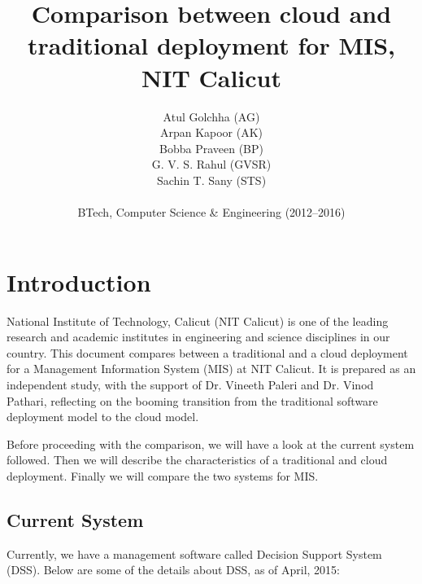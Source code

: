 \documentclass[12pt,a4paper,oneside]{article}
\begin{document}
\title{Comparison between cloud and traditional deployment for MIS, NIT Calicut}
\author{Atul Golchha (AG)
	\\
	Arpan Kapoor (AK)
	\\
	Bobba Praveen (BP)
	\\
	G. V. S. Rahul (GVSR)
	\\
	Sachin T. Sany (STS)
	\\ \\
	BTech, Computer Science \& Engineering (2012--2016)}


\maketitle

\renewcommand \vhAuthorColWidth{.8\hsize}
\renewcommand \vhChangeColWidth{1.2\hsize}

\begin{versionhistory}
\end{versionhistory}


\newpage
\tableofcontents
\newpage

\section{Introduction}
National Institute of Technology, Calicut (NIT Calicut) is one of the leading
research and academic institutes in engineering and science disciplines in our
country. This document compares between a traditional and a cloud deployment
for a Management Information System (MIS) at NIT Calicut. It is prepared as an
independent study, with the support of Dr. Vineeth Paleri and Dr. Vinod Pathari,
reflecting on the booming transition from the traditional software deployment
model to the cloud model.

Before proceeding with the comparison, we will have a look at the current
system followed. Then we will describe the characteristics of a traditional and
cloud deployment. Finally we will compare the two systems for MIS.

\subsection{Current System}
Currently, we have a management software called Decision Support System (DSS).
Below are some of the details about DSS, as of April, 2015:
\end{document}
